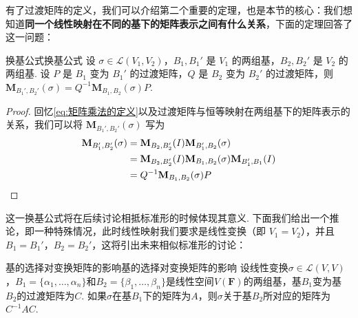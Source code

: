 有了过渡矩阵的定义，我们可以介绍第二个重要的定理，也是本节的核心：我们想知道\textbf{同一个线性映射在不同的基下的矩阵表示之间有什么关系}，下面的定理回答了这一问题：
\begin{theorem}{换基公式}{换基公式}
    设 $\sigma \in \mathcal{L}(V_1,V_2)$，$B_1,B_1'$ 是 $V_1$ 的两组基，$B_2,B_2'$ 是 $V_2$ 的两组基. 设 $P$ 是 $B_1$ 变为 $B_1'$ 的过渡矩阵，$Q$ 是 $B_2$ 变为 $B_2'$ 的过渡矩阵，则 $\mathbf{M}_{B_1',B_2'}(\sigma) = Q^{-1}\mathbf{M}_{B_1,B_2}(\sigma)P$.
\end{theorem}

\begin{proof}
    回忆\autoref{eq:矩阵乘法的定义}以及过渡矩阵与恒等映射在两组基下的矩阵表示的关系，我们可以将 $\mathbf{M}_{B_1',B_2'}(\sigma)$ 写为
    \begin{align*}
        \mathbf{M}_{B_1',B_2'}(\sigma) &= \mathbf{M}_{B_2,B_2'}(I)\mathbf{M}_{B_1',B_2}(\sigma) \\
        &= \mathbf{M}_{B_2,B_2'}(I)\mathbf{M}_{B_1,B_2}(\sigma)\mathbf{M}_{B_1',B_1}(I) \\
        &= Q^{-1} \mathbf{M}_{B_1,B_2}(\sigma)P \qedhere
    \end{align*}
\end{proof}

这一换基公式将在后续讨论相抵标准形的时候体现其意义. 下面我们给出一个推论，即一种特殊情况，此时线性映射我们要求是线性变换（即 $V_1 = V_2$），并且 $B_1 = B_1'$，$B_2 = B_2'$，这将引出未来相似标准形的讨论：
\begin{theorem}{基的选择对变换矩阵的影响}{基的选择对变换矩阵的影响}
    设线性变换$\sigma \in \mathcal{L}(V,V)$，$B_1=\{\alpha_1,\ldots,\alpha_n\}$和$B_2=\{\beta_1,\ldots,\beta_n\}$是线性空间$V(\mathbf{F})$的两组基，基$B_1$变为基$B_2$的过渡矩阵为$C$. 如果$\sigma$在基$B_1$下的矩阵为$A$，则$\sigma$关于基$B_2$所对应的矩阵为$C^{-1}AC$.
\end{theorem}

